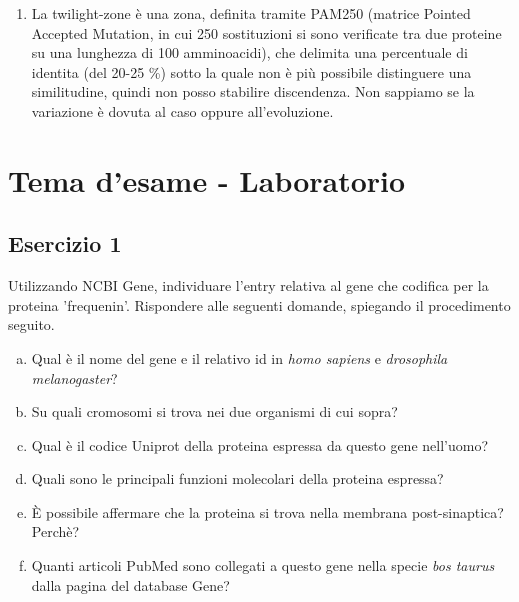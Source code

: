 \documentclass{article}
\begin{document}
\begin{enumerate}[1)]
   \item La twilight-zone è una zona, definita tramite PAM250 (matrice Pointed Accepted Mutation, in cui 250 sostituzioni si sono verificate tra due proteine su una lunghezza di 100 amminoacidi), che delimita una percentuale di identita (del 20-25 \%) sotto la quale non è più possibile distinguere una similitudine, quindi non posso stabilire discendenza. Non sappiamo se la variazione è dovuta al caso oppure all'evoluzione.
\end{enumerate}
\newpage
\section*{Tema d'esame - Laboratorio}
\subsection*{Esercizio 1}
Utilizzando NCBI Gene, individuare l'entry relativa al gene che codifica per la proteina 'frequenin'. Rispondere alle seguenti domande, spiegando il procedimento seguito. 
\begin{enumerate}[a)]
   \item Qual è il nome del gene e il relativo id in \textit{homo sapiens} e \textit{drosophila melanogaster}?
   \item Su quali cromosomi si trova nei due organismi di cui sopra?
   \item Qual è il codice Uniprot della proteina espressa da questo gene nell'uomo?
   \item Quali sono le principali funzioni molecolari della proteina espressa?
   \item È possibile affermare che la proteina si trova nella membrana post-sinaptica? Perchè?
   \item Quanti articoli PubMed sono collegati a questo gene nella specie \textit{bos taurus} dalla pagina del database Gene?
\end{enumerate}
\end{document}
